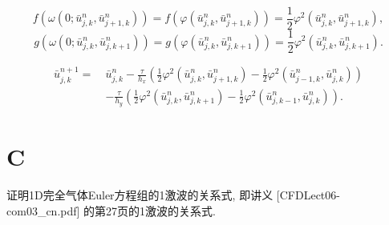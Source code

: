\documentclass[12pt]{article}
\begin{document}
\begin{equation}
	f(\omega(0 ; \bar{u}_{j, k}^{n}, \bar{u}_{j+1, k}^{n}))=f(\varphi(\bar{u}_{j, k}^{n}, \bar{u}_{j+1, k}^{n}))=\frac{1}{2}\varphi^2(\bar{u}_{j, k}^{n}, \bar{u}_{j+1, k}^{n}),
\end{equation}
\begin{equation}
	g(\omega(0 ; \bar{u}_{j, k}^{n}, \bar{u}_{j, k+1}^{n}))=g(\varphi(\bar{u}_{j, k}^{n}, \bar{u}_{j, k+1}^{n}))=\frac{1}{2}\varphi^2(\bar{u}_{j, k}^{n}, \bar{u}_{j, k+1}^{n}).
\end{equation}

\begin{equation}
	\begin{aligned}
		\bar{u}_{j, k}^{n+1} =\  & \bar{u}_{j, k}^{n}-\frac{\tau}{h_{x}}\left(\frac{1}{2}\varphi^2\left( \bar{u}_{j, k}^{n}, \bar{u}_{j+1, k}^{n}\right)-\frac{1}{2}\varphi^2\left( \bar{u}_{j-1, k}^{n}, \bar{u}_{j, k}^{n}\right)\right) \\
		                         & -\frac{\tau}{h_{y}}\left(\frac{1}{2}\varphi^2\left( \bar{u}_{j, k}^{n} ,\bar{u}_{j, k+1}^{n}\right)-\frac{1}{2}\varphi^2\left( \bar{u}_{j, k-1}^{n}, \bar{u}_{j, k}^{n}\right)\right).
	\end{aligned}
\end{equation}



\section{C}

证明1D完全气体Euler方程组的1激波的关系式, 即讲义 [CFDLect06-com03_cn.pdf] 的第27页的1激波的关系式.
\end{document}

